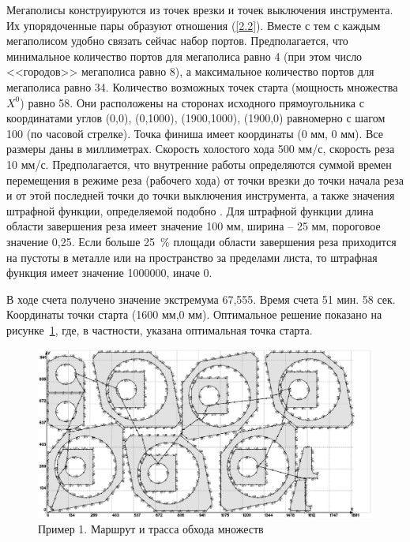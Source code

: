 \documentclass[10pt]{SPIIRAS_Proceedings}
\begin{document}
Мегаполисы конструируются из точек врезки и точек выключения инструмента.
Их упорядоченные пары образуют отношения (\ref{2.2}).
Вместе с тем с каждым мегаполисом удобно связать сейчас набор портов.
Предполагается, что минимальное количество портов для мегаполиса равно 4
(при этом число <<городов>> мегаполиса равно 8),
а максимальное количество портов для мегаполиса равно 34.
Количество возможных точек старта
(мощность множества $X^0$)
равно 58.
Они расположены на сторонах исходного прямоугольника с координатами углов
(0,0), (0,1000), (1900,1000), (1900,0)
равномерно с шагом 100
(по часовой стрелке).
Точка финиша имеет координаты (0 мм, 0 мм).
Все размеры даны в миллиметрах.
Скорость холостого хода 500 мм/с,
скорость реза 10 мм/с.
Предполагается, что внутренние работы определяются
суммой времен перемещения в режиме реза
(рабочего хода)
от точки врезки до точки начала реза
и от этой последней точки до
точки выключения инструмента,
а также значения штрафной функции, определяемой подобно
\cite{18}.
Для штрафной функции длина области завершения реза имеет значение 100 мм,
ширина -- 25 мм,
пороговое значение 0,25.
Если больше 25~\% площади области завершения
реза приходится на пустоты в металле или на пространство за пределами листа,
то штрафная функция имеет значение 1000000, иначе 0.

В ходе счета получено значение экстремума 67,555.
Время счета 51 мин. 58 сек.
Координаты точки старта
(1600 мм,0 мм).
Оптимальное решение показано на рисунке~\ref{fig:1},
где, в частности, указана оптимальная точка старта.


\begin{figure}[h!]
  \centering
  \includegraphics[width=\textwidth]{image.eps}
  \caption{Пример 1. Маршрут и трасса обхода множеств}
  \label{fig:1}
\end{figure}
\end{document}
